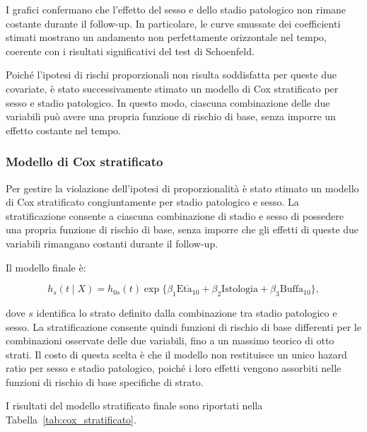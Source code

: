 \documentclass[12pt,a4paper]{article}
\begin{document}
I grafici confermano che l'effetto del sesso e dello stadio patologico non rimane costante durante il follow-up. In particolare, le curve smussate dei coefficienti stimati mostrano un andamento non perfettamente orizzontale nel tempo, coerente con i risultati significativi del test di Schoenfeld.

Poiché l'ipotesi di rischi proporzionali non risulta soddisfatta per queste due covariate, è stato successivamente stimato un modello di Cox stratificato per sesso e stadio patologico. In questo modo, ciascuna combinazione delle due variabili può avere una propria funzione di rischio di base, senza imporre un effetto costante nel tempo.

\subsubsection{Modello di Cox stratificato}

Per gestire la violazione dell'ipotesi di proporzionalità è stato stimato un modello di Cox stratificato congiuntamente per stadio patologico e sesso. La stratificazione consente a ciascuna combinazione di stadio e sesso di possedere una propria funzione di rischio di base, senza imporre che gli effetti di queste due variabili rimangano costanti durante il follow-up.

Il modello finale è:

\begin{equation}
h_s(t \mid X)
=
h_{0s}(t)
\exp\{
\beta_1 \mathrm{Et\grave{a}}_{10}
+\beta_2 \mathrm{Istologia}
+\beta_3 \mathrm{Buffa}_{10}
\},
\label{eq:cox_stratificato}
\end{equation}

dove $s$ identifica lo strato definito dalla combinazione tra stadio patologico e sesso. La stratificazione consente quindi funzioni di rischio di base differenti per le combinazioni osservate delle due variabili, fino a un massimo teorico di otto strati. Il costo di questa scelta è che il modello non restituisce un unico hazard ratio per sesso e stadio patologico, poiché i loro effetti vengono assorbiti nelle funzioni di rischio di base specifiche di strato.

I risultati del modello stratificato finale sono riportati nella Tabella~\ref{tab:cox_stratificato}.
\end{document}
